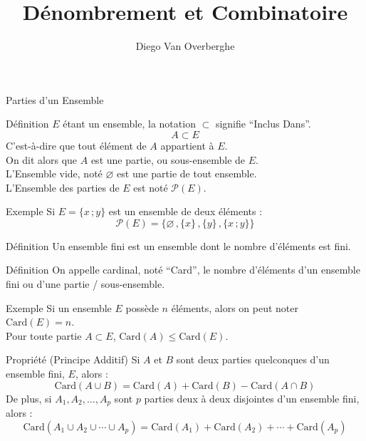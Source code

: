\documentclass{cours}
\title{Dénombrement et Combinatoire}
\author{Diego Van Overberghe}
\begin{document}

    \begin{Gpartie}{Parties d'un Ensemble}
        \begin{Spartie}{Définition}
            $E$ étant un ensemble, la notation $\subset$ signifie ``Inclus Dans''.
            \[A\subset E\]
            C'est-à-dire que tout élément de $A$ appartient à $E$. \\
            On dit alors que $A$ est une partie, ou sous-ensemble de $E$. \\
            L'Ensemble vide, noté $\varnothing$ est une partie de tout ensemble. \\
            L'Ensemble des parties de $E$ est noté $\mathcal{P}(E)$.
            \begin{SSpartie}{Exemple}
                Si $E=\big\{x\,;y\big\}$ est un ensemble de deux éléments :
                \[\mathcal{P}(E)=\Big\{\varnothing\,,\big\{x\big\}\,,\big\{y\big\}\,,\big\{x\,;y\big\}\Big\}\]
            \end{SSpartie}
        \end{Spartie}
        \begin{Spartie}{Définition}
            Un ensemble fini est un ensemble dont le nombre d'éléments est fini.
        \end{Spartie}
        \begin{Spartie}{Définition}
            On appelle cardinal, noté ``Card'', le nombre d'éléments d'un ensemble fini ou d'une partie / sous-ensemble.
            \begin{SSpartie}{Exemple}
                Si un ensemble $E$ possède $n$ éléments, alors on peut noter $\text{Card}(E)=n$. \\
                Pour toute partie $A\subset E$, $\text{Card}(A)\leq\text{Card}(E)$.
            \end{SSpartie}
        \end{Spartie}
        \begin{Spartie}{Propriété (Principe Additif)}
            Si $A$ et $B$ sont deux parties quelconques d'un ensemble fini, $E$, alors :
            \[\text{Card}(A\cup B)=\text{Card}(A)+\text{Card}(B)-\text{Card}(A\cap B)\]
            De plus, si $A_1, A_2,\dotsc, A_p$ sont $p$ parties deux à deux disjointes d'un ensemble fini, alors :
            \[\text{Card}(A_1\cup A_2\cup\dotsb\cup A_p)=\text{Card}(A_1)+\text{Card}(A_2)+\dotsb+\text{Card}(A_p)\]

\end{Spartie}
\end{Gpartie}
\end{document}
